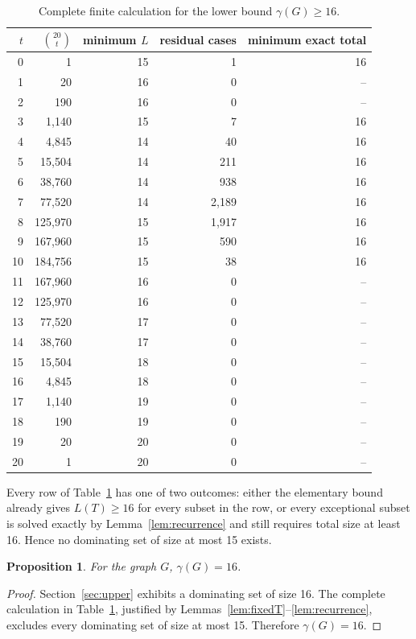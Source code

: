 \documentclass[11pt]{article}
\newtheorem{proposition}[theorem]{Proposition}
\theoremstyle{definition}
\theoremstyle{remark}
\begin{document}
\begin{table}[ht]
\centering
\small
\begin{tabular}{rrrrr}
\toprule
\(t\) & \(\binom{20}{t}\) & minimum \(L\) & residual cases & minimum exact total\\
\midrule
0&1&15&1&16\\
1&20&16&0&--\\
2&190&16&0&--\\
3&1,140&15&7&16\\
4&4,845&14&40&16\\
5&15,504&14&211&16\\
6&38,760&14&938&16\\
7&77,520&14&2,189&16\\
8&125,970&15&1,917&16\\
9&167,960&15&590&16\\
10&184,756&15&38&16\\
11&167,960&16&0&--\\
12&125,970&16&0&--\\
13&77,520&17&0&--\\
14&38,760&17&0&--\\
15&15,504&18&0&--\\
16&4,845&18&0&--\\
17&1,140&19&0&--\\
18&190&19&0&--\\
19&20&20&0&--\\
20&1&20&0&--\\
\bottomrule
\end{tabular}
\caption{Complete finite calculation for the lower bound \(\gamma(G)\ge16\).}
\label{tab:finite}
\end{table}

Every row of Table~\ref{tab:finite} has one of two outcomes: either the elementary bound already gives \(L(T)\ge16\) for every subset in the row, or every exceptional subset is solved exactly by Lemma~\ref{lem:recurrence} and still requires total size at least 16.  Hence no dominating set of size at most 15 exists.

\begin{proposition}\label{prop:gamma}
For the graph \(G\), \(\gamma(G)=16\).
\end{proposition}

\begin{proof}
Section~\ref{sec:upper} exhibits a dominating set of size 16.  The complete calculation in Table~\ref{tab:finite}, justified by Lemmas~\ref{lem:fixedT}--\ref{lem:recurrence}, excludes every dominating set of size at most 15.  Therefore \(\gamma(G)=16\).
\end{proof}
\end{document}
